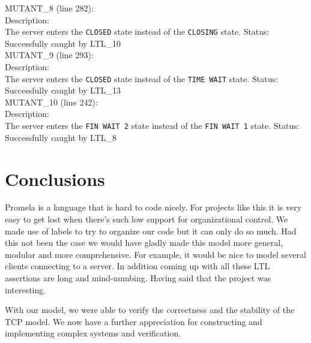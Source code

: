 \documentclass{WigReport}
\begin{document}
MUTANT\_8 (line 282):\\
Description:\\
The server enters the \verb|CLOSED| state instead of the \verb|CLOSING| state.
Status: Successfully caught by LTL\_10
\\

MUTANT\_9 (line 293):\\
Description:\\
The server enters the \verb|CLOSED| state instead of the \verb|TIME WAIT| state.
Status: Successfully caught by LTL\_13
\\

MUTANT\_10 (line 242):\\
Description:\\
The server enters the \verb|FIN WAIT 2| state instead of the \verb|FIN WAIT 1| state.
Status: Successfully caught by LTL\_8
\\

\section{Conclusions}

Promela is a language that is hard to code nicely. For projects like this it
is very easy to get lost when there's such low support for organizational
control. We made use of labels to try to organize our code but it can only do
so much. Had this not been the case we would have
gladly made this model more general, modular and more comprehensive.
For example, it would be nice to model several clients connecting to a server.
In addition coming up with all these LTL assertions are long and mind-numbing.
Having said that the project was interesting.

With our model, we were able to verify the correctness and the stability of
the TCP model. We now have a further appreciation for constructing and
implementing complex systems and verification.
\end{document}
